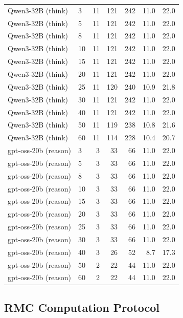 \documentclass[conference]{IEEEtran}
\theoremstyle{remark}
\begin{document}
\begin{longtable}{llrrrrr}
Qwen3-32B (think) & 3 & 11 & 121 & 242 & 11.0 & 22.0 \\
Qwen3-32B (think) & 5 & 11 & 121 & 242 & 11.0 & 22.0 \\
Qwen3-32B (think) & 8 & 11 & 121 & 242 & 11.0 & 22.0 \\
Qwen3-32B (think) & 10 & 11 & 121 & 242 & 11.0 & 22.0 \\
Qwen3-32B (think) & 15 & 11 & 121 & 242 & 11.0 & 22.0 \\
Qwen3-32B (think) & 20 & 11 & 121 & 242 & 11.0 & 22.0 \\
Qwen3-32B (think) & 25 & 11 & 120 & 240 & 10.9 & 21.8 \\
Qwen3-32B (think) & 30 & 11 & 121 & 242 & 11.0 & 22.0 \\
Qwen3-32B (think) & 40 & 11 & 121 & 242 & 11.0 & 22.0 \\
Qwen3-32B (think) & 50 & 11 & 119 & 238 & 10.8 & 21.6 \\
Qwen3-32B (think) & 60 & 11 & 114 & 228 & 10.4 & 20.7 \\
gpt-oss-20b (reason) & 3 & 3 & 33 & 66 & 11.0 & 22.0 \\
gpt-oss-20b (reason) & 5 & 3 & 33 & 66 & 11.0 & 22.0 \\
gpt-oss-20b (reason) & 8 & 3 & 33 & 66 & 11.0 & 22.0 \\
gpt-oss-20b (reason) & 10 & 3 & 33 & 66 & 11.0 & 22.0 \\
gpt-oss-20b (reason) & 15 & 3 & 33 & 66 & 11.0 & 22.0 \\
gpt-oss-20b (reason) & 20 & 3 & 33 & 66 & 11.0 & 22.0 \\
gpt-oss-20b (reason) & 25 & 3 & 33 & 66 & 11.0 & 22.0 \\
gpt-oss-20b (reason) & 30 & 3 & 33 & 66 & 11.0 & 22.0 \\
gpt-oss-20b (reason) & 40 & 3 & 26 & 52 & 8.7 & 17.3 \\
gpt-oss-20b (reason) & 50 & 2 & 22 & 44 & 11.0 & 22.0 \\
gpt-oss-20b (reason) & 60 & 2 & 22 & 44 & 11.0 & 22.0 \\
\end{longtable}

\subsection{RMC Computation Protocol}
\end{document}
